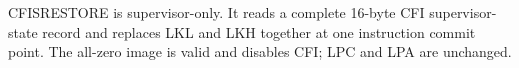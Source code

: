 CFISRESTORE is supervisor-only. It reads a complete 16-byte CFI supervisor-state record and replaces LKL and LKH together at one instruction commit point. The all-zero image is valid and disables CFI; LPC and LPA are unchanged.
